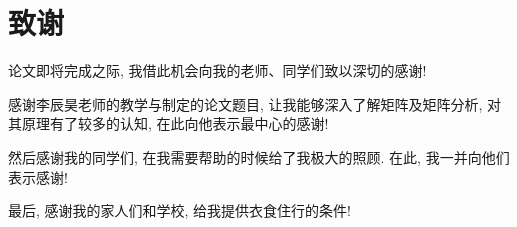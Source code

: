 \section*{致谢}

\par 论文即将完成之际, 我借此机会向我的老师、同学们致以深切的感谢!
\par 感谢李辰昊老师的教学与制定的论文题目, 让我能够深入了解矩阵及矩阵分析, 对其原理有了较多的认知, 在此向他表示最中心的感谢!
\par 然后感谢我的同学们, 在我需要帮助的时候给了我极大的照顾. 在此, 我一并向他们表示感谢!
\par 最后, 感谢我的家人们和学校, 给我提供衣食住行的条件!